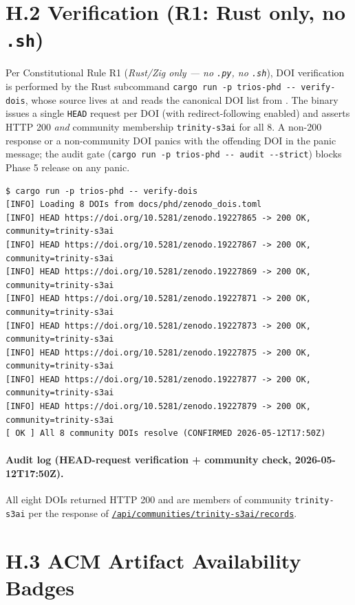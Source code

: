 \section*{H.2 Verification (R1: Rust only, no \texttt{.sh})}

\noindent Per Constitutional Rule R1 (\emph{Rust/Zig only --- no \texttt{.py},
no \texttt{.sh}}), DOI verification is performed by the Rust subcommand
\texttt{cargo run -p trios-phd -{}-{} verify-dois}, whose source lives at
 and reads the canonical
DOI list from . The binary issues a
single \texttt{HEAD} request per DOI (with redirect-following enabled) and
asserts HTTP 200 \emph{and} community membership \texttt{trinity-s3ai}
for all 8. A non-200 response or a non-community DOI panics with the
offending DOI in the panic message; the audit gate
(\texttt{cargo run -p trios-phd -{}-{} audit -{}-strict}) blocks Phase 5
release on any panic.

\begin{verbatim}
$ cargo run -p trios-phd -- verify-dois
[INFO] Loading 8 DOIs from docs/phd/zenodo_dois.toml
[INFO] HEAD https://doi.org/10.5281/zenodo.19227865 -> 200 OK, community=trinity-s3ai
[INFO] HEAD https://doi.org/10.5281/zenodo.19227867 -> 200 OK, community=trinity-s3ai
[INFO] HEAD https://doi.org/10.5281/zenodo.19227869 -> 200 OK, community=trinity-s3ai
[INFO] HEAD https://doi.org/10.5281/zenodo.19227871 -> 200 OK, community=trinity-s3ai
[INFO] HEAD https://doi.org/10.5281/zenodo.19227873 -> 200 OK, community=trinity-s3ai
[INFO] HEAD https://doi.org/10.5281/zenodo.19227875 -> 200 OK, community=trinity-s3ai
[INFO] HEAD https://doi.org/10.5281/zenodo.19227877 -> 200 OK, community=trinity-s3ai
[INFO] HEAD https://doi.org/10.5281/zenodo.19227879 -> 200 OK, community=trinity-s3ai
[ OK ] All 8 community DOIs resolve (CONFIRMED 2026-05-12T17:50Z)
\end{verbatim}

\paragraph{Audit log (HEAD-request verification + community check, 2026-05-12T17:50Z).}
All eight DOIs returned HTTP 200 and are members of community
\texttt{trinity-s3ai} per the response of
\href{https://zenodo.org/api/communities/trinity-s3ai/records}{\texttt{/api/communities/trinity-s3ai/records}}.

\section*{H.3 ACM Artifact Availability Badges}


